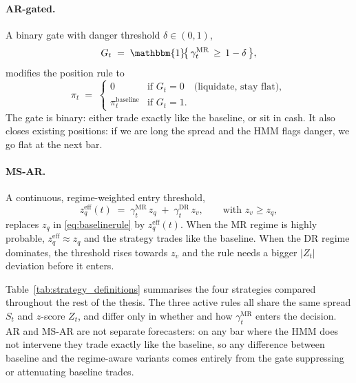 \paragraph{AR-gated.} A binary gate with danger threshold $\delta \in (0,1)$,
\begin{equation}\label{eq:argate}
    G_t \;=\; \mathbbm{1}\!\bigl\{\,\gamma_t^{\mathrm{MR}} \,\geq\, 1-\delta\,\bigr\},
\end{equation}
modifies the position rule to
\begin{equation}\label{eq:arpositionrule}
    \pi_t \;=\;
    \begin{cases}
        0 & \text{if } G_t = 0 \quad\text{(liquidate, stay flat)},\\[2pt]
        \pi_t^{\mathrm{baseline}} & \text{if } G_t = 1.
    \end{cases}
\end{equation}
The gate is binary: either trade exactly like the baseline, or sit in cash. It also closes existing positions: if we are long the spread and the HMM flags danger, we go flat at the next bar.

\paragraph{MS-AR.} A continuous, regime-weighted entry threshold,
\begin{equation}\label{eq:msarthreshold}
    z_q^{\mathrm{eff}}(t) \;=\; \gamma_t^{\mathrm{MR}}\, z_q \;+\; \gamma_t^{\mathrm{DR}}\, z_v,
    \qquad\text{with } z_v \geq z_q,
\end{equation}
replaces $z_q$ in \eqref{eq:baselinerule} by $z_q^{\mathrm{eff}}(t)$. When the MR regime is highly probable, $z_q^{\mathrm{eff}} \approx z_q$ and the strategy trades like the baseline. When the DR regime dominates, the threshold rises towards $z_v$ and the rule needs a bigger $|Z_t|$ deviation before it enters.

Table~\ref{tab:strategy_definitions} summarises the four strategies compared throughout the rest of the thesis. The three active rules all share the same spread $S_t$ and $z$-score $Z_t$, and differ only in whether and how $\gamma_t^{\mathrm{MR}}$ enters the decision. AR and MS-AR are not separate forecasters: on any bar where the HMM does not intervene they trade exactly like the baseline, so any difference between baseline and the regime-aware variants comes entirely from the gate suppressing or attenuating baseline trades.

